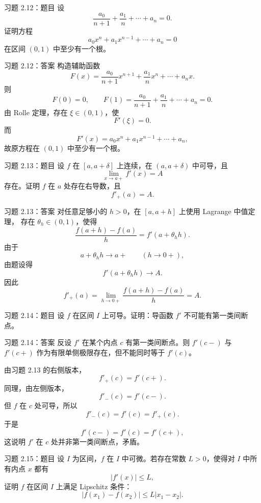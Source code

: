\documentclass[aspectratio=169,10pt]{ctexbeamer}
\begin{document}
\begin{frame}{习题 2.12：题目}
\small
设
\[
  \frac{a_0}{n+1}+\frac{a_1}{n}+\cdots+a_n=0.
\]
证明方程
\[
  a_0x^n+a_1x^{n-1}+\cdots+a_n=0
\]
在区间 $(0,1)$ 中至少有一个根。
\end{frame}

\begin{frame}{习题 2.12：答案}
\small
构造辅助函数
\[
  F(x)=\frac{a_0}{n+1}x^{n+1}
       +\frac{a_1}{n}x^n+\cdots+a_nx.
\]
则
\[
  F(0)=0,\qquad
  F(1)=\frac{a_0}{n+1}+\frac{a_1}{n}+\cdots+a_n=0.
\]
由 Rolle 定理，存在 $\xi\in(0,1)$，使
\[
  F'(\xi)=0.
\]
而
\[
  F'(x)=a_0x^n+a_1x^{n-1}+\cdots+a_n,
\]
故原方程在 $(0,1)$ 中至少有一个根。
\end{frame}

\begin{frame}{习题 2.13：题目}
\small
设 $f$ 在 $[a,a+\delta]$ 上连续，在 $(a,a+\delta)$ 中可导，且
\[
  \lim_{x\to a+}f'(x)=A
\]
存在。证明 $f$ 在 $a$ 处存在右导数，且
\[
  f'_+(a)=A.
\]
\end{frame}

\begin{frame}{习题 2.13：答案}
\small
对任意足够小的 $h>0$，在 $[a,a+h]$ 上使用 Lagrange 中值定理，
存在 $\theta_h\in(0,1)$，使得
\[
  \frac{f(a+h)-f(a)}{h}=f'(a+\theta_hh).
\]
由于
\[
  a+\theta_hh\to a+ \qquad (h\to0+),
\]
由题设得
\[
  f'(a+\theta_hh)\to A.
\]
因此
\[
  f'_+(a)=
  \lim_{h\to0+}\frac{f(a+h)-f(a)}h=A.
\]
\end{frame}

\begin{frame}{习题 2.14：题目}
\small
设 $f$ 在区间 $I$ 上可导。证明：导函数 $f'$ 不可能有第一类间断点。
\end{frame}

\begin{frame}{习题 2.14：答案}
\small
反设 $f'$ 在某个内点 $c$ 有第一类间断点。则 $f'(c-)$ 与 $f'(c+)$
作为有限单侧极限存在，但不能同时等于 $f'(c)$。

由习题 2.13 的右侧版本，
\[
  f'_+(c)=f'(c+).
\]
同理，由左侧版本，
\[
  f'_-(c)=f'(c-).
\]
但 $f$ 在 $c$ 处可导，所以
\[
  f'_-(c)=f'(c)=f'_+(c).
\]
于是
\[
  f'(c-)=f'(c)=f'(c+),
\]
这说明 $f'$ 在 $c$ 处并非第一类间断点，矛盾。
\end{frame}

\begin{frame}{习题 2.15：题目}
\small
设 $I$ 为区间，$f$ 在 $I$ 中可微。若存在常数 $L>0$，使得对 $I$
中所有内点 $x$ 都有
\[
  |f'(x)|\le L,
\]
证明 $f$ 在区间 $I$ 上满足 Lipschitz 条件：
\[
  |f(x_1)-f(x_2)|\le L|x_1-x_2|.
\]
\end{frame}
\end{document}
